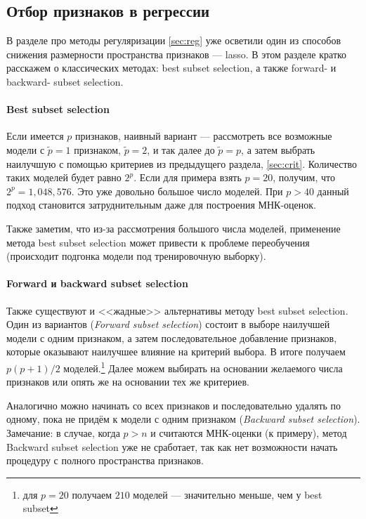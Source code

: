 \documentclass[12pt,a4paper,final]{article}
\newcommand{\1}{\mathds{1}}
\begin{document}
\subsection{Отбор признаков в регрессии}

В разделе про методы регуляризации \ref{sec:reg} уже осветили один из способов снижения размерности пространства признаков --- lasso. В этом разделе кратко расскажем о классических методах: best subset selection, а также forward- и backward- subset selection.

\paragraph{Best subset selection}
Если имеется $p$ признаков, наивный вариант --- рассмотреть все возможные модели с $\tilde p = 1$ признаком, $\tilde p = 2$, и так далее до $\tilde p = p$, а затем выбрать наилучшую с помощью критериев из предыдущего раздела, \ref{sec:crit}. Количество таких моделей будет равно $2^p$. Если для примера взять $p = 20$, получим, что $2^p = 1,048,576$. Это уже довольно большое число моделей. При $p > 40$ данный подход становится затруднительным даже для построения МНК-оценок.

Также заметим, что из-за рассмотрения большого числа моделей, применение метода best subset selection может привести к проблеме переобучения (происходит подгонка модели под тренировочную выборку).

\paragraph{Forward и backward subset selection}
Также существуют и <<жадные>> альтернативы методу best subset selection. Один из вариантов (\textit{Forward subset selection}) состоит в выборе наилучшей модели с одним признаком, а затем последовательное добавление признаков, которые оказывают наилучшее влияние на критерий выбора. В итоге получаем $p(p+1)/2$ моделей.\footnote{для $p = 20$ получаем $210$ моделей --- значительно меньше, чем у best subset} Далее можем выбирать на основании желаемого числа признаков или опять же на основании тех же критериев. 

Аналогично можно начинать со всех признаков и последовательно удалять по одному, пока не придём к модели с одним признаком (\textit{Backward subset selection}). Замечание: в случае, когда $p>n$ и считаются МНК-оценки (к примеру), метод Backward subset selection уже не сработает, так как нет возможности начать процедуру с полного пространства признаков.
\end{document}
